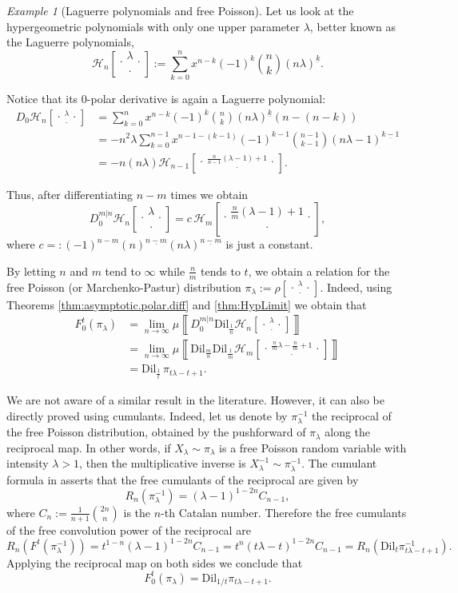 \documentclass[reqno,11pt]{amsart}
\theoremstyle{remark}
\newtheorem{example}[theorem]{Example}
\newcommand{\dil}[1]{\mbox{Dil}_{#1}}
\newcommand{\falling}[2]{\left(#1\right)^{\underline{#2}}}
\newcommand*\HGP[3]{%
 \mathcal{H}_{#1}{\left[\genfrac..{0pt}{1}{#2}{#3}\right]}%
}
\newcommand*\SRM[2]{%
 \rho{\left[\genfrac..{0pt}{1}{#1}{#2}\right]}%
}
\newcommand{\polar}[1]{D_{#1}}
\newcommand{\polars}[3]{D_{#1}^{#2|#3}}
\newcommand{\freepower}[1]{F^{#1}}
\newcommand{\meas}[1]{\mu \left\llbracket #1 \right\rrbracket}
\begin{document}
\begin{example}[Laguerre polynomials and free Poisson]
\label{exm:free.poisson}
Let us look at the hypergeometric polynomials with only one upper parameter $\lambda$, better known as the Laguerre polynomials,
$$\HGP{n}{\lambda}{\cdot}:=\sum_{k=0}^n x^{n-k} (-1)^k \binom{n}{k} \falling{n\lambda}{k}.$$

Notice that its $0$-polar derivative is again a Laguerre polynomial:
\begin{align*}
\polar{0}\HGP{n}{\lambda}{\cdot}&=\sum_{k=0}^n x^{n-k} (-1)^k \binom{n}{k} \falling{n\lambda}{k} (n-(n-k)) \\
&=-n^2\lambda \sum_{k=0}^{n-1} x^{n-1-(k-1)} (-1)^{k-1} \binom{n-1}{k-1} \falling{n\lambda -1}{k-1} \\
&=-n(n\lambda) \HGP{n-1}{\frac{n}{n-1}(\lambda-1)+1}{\cdot}.
\end{align*}

Thus, after differentiating $n-m$ times we obtain
$$\polars{0}{m}{n}\HGP{n}{\lambda}{\cdot}=c \, \HGP{m}{\frac{n}{m}(\lambda-1)+1}{\cdot},$$ 
where $c=:(-1)^{n-m}\falling{n}{n-m} \falling{n\lambda}{n-m}$ is just a constant.

By letting $n$ and $m$ tend to $\infty$ while $\frac{n}{m}$ tends to $t$, we obtain a relation for the free Poisson (or Marchenko-Pastur) distribution $\pi_\lambda:=\SRM{\lambda}{\cdot}$. Indeed, using Theorems \ref{thm:asymptotic.polar.diff} and  \ref{thm:HypLimit} we obtain that
\begin{align*}
F_0^t\left( \pi_\lambda \right) &= \lim_{n\to\infty}\meas{\polars{0}{m}{n} \dil{\frac{1}{n}} \HGP{n}{\lambda}{\cdot} }\\
&= \lim_{n\to\infty} \meas{ \dil{\frac{m}{n}} \dil{\frac{1}{m}}  \HGP{m}{\frac{n}{m}\lambda-\frac{n}{m}+1}{\cdot} }\\
&= \dil{\frac{1}{t}}\,  \pi_{t\lambda-t+1}.
\end{align*}

We are not aware of a similar result in the literature. However, it can also be directly proved using cumulants. Indeed, let us denote by $\pi_\lambda^{-1}$ the reciprocal of the free Poisson distribution, obtained by the pushforward of $\pi_\lambda$ along the reciprocal map. In other words, if $ X_\lambda \sim \pi_\lambda $ is a free Poisson random variable with intensity $\lambda>1$, then the multiplicative inverse is $X_\lambda^{-1}\sim \pi_\lambda^{-1}$. The cumulant formula in \cite[Remark 3.2]{Szpojankowski14} asserts that the free cumulants of the reciprocal are given by
$$ R_n\left( \pi_\lambda^{-1} \right) = (\lambda-1)^{1-2n}C_{n-1}, $$
where $C_n:= \frac{1}{n+1}\binom{2n}{n}$ is the $n$-th Catalan number.
Therefore the free cumulants of the free convolution power of the reciprocal are 
$$ R_n\left( \freepower{t} (\pi_\lambda^{-1})\right) = t^{1-n}( \lambda-1 )^{1-2n}C_{n-1} = t^{n}(t\lambda -t)^{1-2n}C_{n-1}=R_n\left( \dil{t}\pi^{-1}_{t\lambda -t +1}\right).$$
Applying the reciprocal map on both sides we conclude that
\begin{equation}
\label{eq.polar.0.poisson}
    F_0^t( \pi_{\lambda} ) = \dil{1/t} \pi_{ {t\lambda -t +1}  }.
\end{equation}


\end{example}
\end{document}
